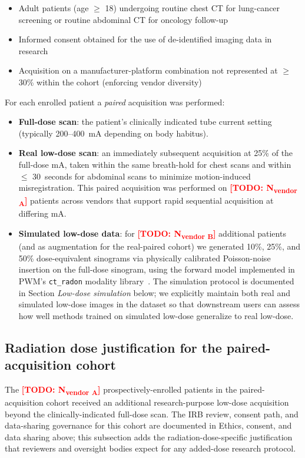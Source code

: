 \documentclass[twoside,11pt]{article}
\newcommand{\todo}[1]{\textcolor{red}{\textbf{[TODO: #1]}}}
\newcommand{\NvendorA}{\todo{N\textsubscript{vendor A}}}
\newcommand{\NvendorB}{\todo{N\textsubscript{vendor B}}}
\begin{document}
\begin{itemize}
    \item Adult patients (age $\geq$ 18) undergoing routine chest CT for lung-cancer screening or routine abdominal CT for oncology follow-up
    \item Informed consent obtained for the use of de-identified imaging data in research
    \item Acquisition on a manufacturer-platform combination not represented at $\geq$ 30\% within the cohort (enforcing vendor diversity)
\end{itemize}

For each enrolled patient a \textit{paired} acquisition was performed:

\begin{itemize}
    \item \textbf{Full-dose scan}: the patient's clinically indicated tube current setting (typically 200--400~mA depending on body habitus).
    \item \textbf{Real low-dose scan}: an immediately subsequent acquisition at 25\% of the full-dose mA, taken within the same breath-hold for chest scans and within $\leq$ 30~seconds for abdominal scans to minimize motion-induced misregistration. This paired acquisition was performed on \NvendorA{} patients across vendors that support rapid sequential acquisition at differing mA.
    \item \textbf{Simulated low-dose data}: for \NvendorB{} additional patients (and as augmentation for the real-paired cohort) we generated 10\%, 25\%, and 50\% dose-equivalent sinograms via physically calibrated Poisson-noise insertion on the full-dose sinogram, using the forward model implemented in PWM's \texttt{ct\_radon} modality library~\citep{pwmcore}. The simulation protocol is documented in Section \textit{Low-dose simulation} below; we explicitly maintain both real and simulated low-dose images in the dataset so that downstream users can assess how well methods trained on simulated low-dose generalize to real low-dose.
\end{itemize}

\subsection*{Radiation dose justification for the paired-acquisition cohort}

The \NvendorA{} prospectively-enrolled patients in the paired-acquisition cohort received an additional research-purpose low-dose acquisition beyond the clinically-indicated full-dose scan. The IRB review, consent path, and data-sharing governance for this cohort are documented in Ethics, consent, and data sharing above; this subsection adds the radiation-dose-specific justification that reviewers and oversight bodies expect for any added-dose research protocol.
\end{document}
